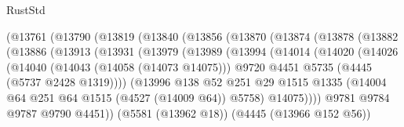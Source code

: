 \begin{lexlean}{RustStd}
\begin{coremodule}
{\begin{coremodule}
{{{{{{{{{{{{{{{{{{{{{{{{{{{{{{{{{{{{{{                    (@13761
                      (@13790
                        (@13819
                          (@13840
                            (@13856
                              (@13870
                                (@13874
                                  (@13878
                                    (@13882
                                      (@13886
                                        (@13913
                                          (@13931
                                            (@13979
                                              (@13989
                                                (@13994
                                                  (@14014
                                                    (@14020
                                                      (@14026
                                                        (@14040
                                                          (@14043 (@14058 (@14073 @14075)))
                                                          @9720
                                                          @4451
                                                          @5735
                                                          (@4445 (@5737 @2428 @1319))))
                                                      (@13996
                                                        @138
                                                        @52
                                                        @251
                                                        @29
                                                        @1515
                                                        @1335
                                                        (@14004
                                                          @64
                                                          @251
                                                          @64
                                                          @1515
                                                          (@4527 (@14009 @64))
                                                          @5758)
                                                        @14075))))
                                                @9781
                                                @9784
                                                @9787
                                                @9790
                                                @4451))
                                            (@5581 (@13962 @18))
                                            (@4445 (@13966 @152 @56))
}}}}}}}}}}}}}}}}}}}}}}}}}}}}}}}}}}}}}}
\end{coremodule}}
\end{coremodule}
\end{lexlean}
